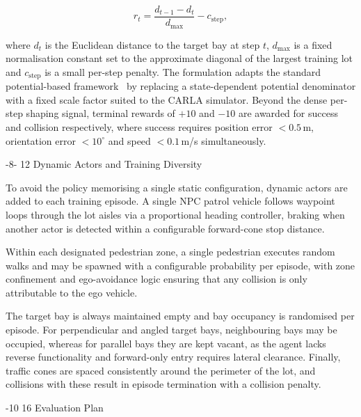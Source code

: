 \documentclass{sig-alternate}
\makeatletter
\renewcommand\section{\@startsection{section}{1}{\z@}%
    {-10\p@ \@plus -4\p@ \@minus -2\p@}%
    {16\p@}%
    {\baselineskip 14pt\secfnt\@ucheadtrue}}
\renewcommand\subsection{\@startsection{subsection}{2}{\z@}%
    {-8\p@ \@plus -2\p@ \@minus -\p@}%
    {12\p@}%
    {\secfnt}}
\makeatother
\begin{document}
\begin{equation}
    r_t = \frac{d_{t-1} - d_t}{d_{\max}} - c_{\text{step}},
    \label{eq:reward}
\end{equation}

\noindent where $d_t$ is the Euclidean distance to the target bay at step $t$, $d_{\max}$ is a fixed normalisation constant set to the approximate diagonal of the largest training lot and $c_{\text{step}}$ is a small per-step penalty. The formulation adapts the standard potential-based framework~\cite{ng1999reward} by replacing a state-dependent potential denominator with a fixed scale factor suited to the CARLA simulator. Beyond the dense per-step shaping signal, terminal rewards of $+10$ and $-10$ are awarded for success and collision respectively, where success requires position error $< 0.5$\,m, orientation error $< 10^\circ$ and speed $< 0.1$\,m/s simultaneously. 

\subsection{Dynamic Actors and Training Diversity}

To avoid the policy memorising a single static configuration, dynamic actors are added to each training episode. A single NPC patrol vehicle follows waypoint loops through the lot aisles via a proportional heading controller, braking when another actor is detected within a configurable forward-cone stop distance.

Within each designated pedestrian zone, a single pedestrian executes random walks and may be spawned with a configurable probability per episode, with zone confinement and ego-avoidance logic ensuring that any collision is only attributable to the ego vehicle. 

The target bay is always maintained empty and bay occupancy is randomised per episode. For perpendicular and angled target bays, neighbouring bays may be occupied, whereas for parallel bays they are kept vacant, as the agent lacks reverse functionality and forward-only entry requires lateral clearance. Finally, traffic cones are spaced consistently around the perimeter of the lot, and collisions with these result in episode termination with a collision penalty.

\newpage

\section{Evaluation Plan}
\label{sec:evaluation}
\end{document}
